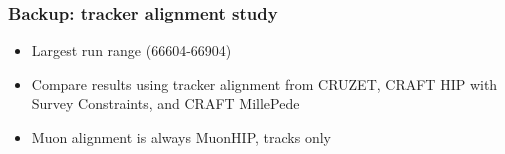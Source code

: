 \documentclass[compress]{beamer}
\begin{document}
\begin{frame}
\frametitle{Backup: tracker alignment study}

\vfill
\begin{itemize}
\item Largest run range (66604-66904)
\item Compare results using tracker alignment from CRUZET, CRAFT HIP with Survey Constraints, and CRAFT MillePede
\item Muon alignment is always MuonHIP, tracks only
\end{itemize}

\vfill
\vfill
{}

\end{frame}
\end{document}
